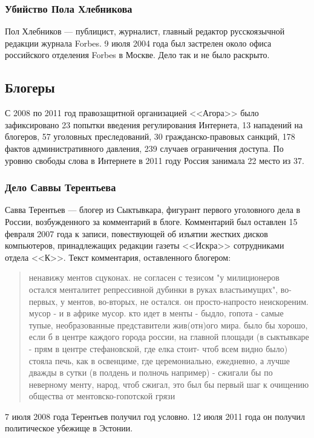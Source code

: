 \subsubsection{Убийство Пола Хлебникова}
Пол Хлебников --- публицист, журналист, главный редактор русскоязычной редакции журнала Forbes. 9 июля 2004 года был застрелен около офиса российского отделения Forbes в Москве\cite{hlebnikov_death}. Дело так и не было раскрыто.
\subsection{Блогеры}
С 2008 по 2011 год правозащитной организацией <<Агора>> было зафиксировано 23 попытки введения регулирования Интернета, 13 нападений на блогеров, 57 уголовных преследований, 30 гражданско-правовых санкций, 178 фактов административного давления, 239 случаев ограничения доступа\cite{agoranet,agoranet2011}. По уровню свободы слова в Интернете в 2011 году Россия занимала 22 место из 37\cite{netfreedom}.
\subsubsection{Дело Саввы Терентьева}
Савва Терентьев --- блогер из Сыктывкара, фигурант первого уголовного дела в России, возбужденного за комментарий в блоге. Комментарий был оставлен 15 февраля 2007 года к записи, повествующей об изъятии жестких дисков компьютеров, принадлежащих редакции газеты <<Искра>> сотрудниками отдела <<К>>\cite{terentyev_k}.
Текст комментария, оставленного блогером\cite{terentyev_quote}:
\begin{quote}ненавижу ментов сцуконах. не согласен с тезисом "у милиционеров остался менталитет репрессивной дубинки в руках властьимущих", во-первых, у ментов, во-вторых, не остался. он просто-напросто неискореним. мусор - и в африке мусор. кто идет в менты - быдло, гопота - самые тупые, необразованные представители жив(отн)ого мира. было бы хорошо, если б в центре каждого города россии, на главной площади (в сыктывкаре - прям в центре стефановской, где елка стоит- чтоб всем видно было) стояла печь, как в освенциме, где церемониально, ежедневно, а лучше дважды в сутки (в полдень и полночь например) - сжигали бы по неверному менту, народ, чтоб сжигал, это был бы первый шаг к очищению общества от ментовско-гопотской грязи\end{quote}
7 июля 2008 года Терентьев получил год условно\cite{terentyev_year}. 12 июля 2011 года он получил политическое убежище в Эстонии\cite{terentyev_estonia}.
